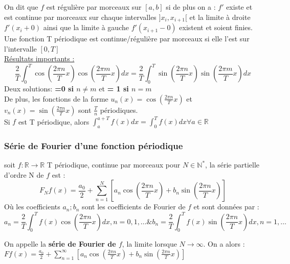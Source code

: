 \documentclass[../main.tex]{subfiles}
\begin{document}
On dit que $f$ est régulière par morceaux sur $[a,b]$ si de plus on a : $f'$ existe et est continue par morceaux sur chaque intervalles $]x_i, x_{i+1}[$ et la limite à droite $f'(x_i+0)$ ainsi que la limite à gauche $f'(x_{i+1}-0)$ existent et soient finies.\\

Une fonction T périodique est continue/régulière par morceaux si elle l'est sur l'intervalle $[0,T]$\\

\quad \underline{Résultats importants :}\\
\begin{equation}
    \frac{2}{T}\int_0^T \cos{(\frac{2\pi n}{T}x)} \cos{(\frac{2\pi m}{T}x)}dx = \frac{2}{T}\int_0^T \sin{(\frac{2\pi n}{T}x)} \sin{(\frac{2\pi m}{T}x)}dx
\end{equation}
Deux solutions: \textbf{=0 si $n\neq m$} et \textbf{= 1 si $n=m$}\\

De plus, les fonctions de la forme $u_n(x) = \cos{(\frac{2\pi n}{T}x)}$ et $v_n(x) = \sin{(\frac{2\pi n}{T}x)}$ sont $\frac{T}{n}$ périodiques.\\

Si $f$ est T périodique, alors $\int_a^{a+T} f(x)dx = \int_0^T f(x)dx \forall a\in \mathbb{R}$\\

\subsubsection{Série de Fourier d'une fonction périodique}
soit $f:\mathbb{R} \rightarrow \mathbb{R}$ T périodique, continue par morceaux pour $N \in \mathbb{N}^*$, la série partielle d'ordre N de $f$ est :\\
\begin{equation}
    F_N f(x) = \frac{a_0}{2}+\sum_{n=1}^N [a_n \cos{(\frac{2\pi n}{T}x)} + b_n \sin{(\frac{2\pi n}{T}x)}]
\end{equation}
Où les coefficients $a_n; b_n$ sont les coefficients de Fourier de $f$ et sont données par :\\
\begin{equation}
    a_n = \frac{2}{T} \int_0^T f(x) \cos{(\frac{2\pi n}{T}x)} dx, n=0,1,\dots \& b_n = \frac{2}{T} \int_0^T f(x) \sin{(\frac{2\pi n}{T}x)}dx, n=1,\dots
\end{equation}

On appelle la \textbf{série de Fourier de $f$}, la limite lorsque $N\rightarrow \infty$. On a alors :\\
$F f(x) = \frac{a_0}{2} + \sum_{n=1}^{\infty}[a_n \cos{(\frac{2\pi n}{T}x)} + b_n \sin{(\frac{2\pi n}{T}x)}]$\\
\end{document}
